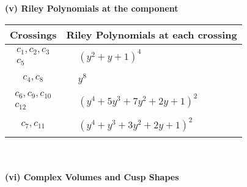 \documentclass[1p]{elsarticle_modified}
\theoremstyle{definition}
\begin{document}
\newpage\renewcommand{\arraystretch}{1}
\flushleft \textbf{(v) Riley Polynomials at the component}\newline \\
\begin{tabular}{m{50pt}|m{274pt}}
Crossings & \hspace{64pt}Riley Polynomials at each crossing \\
\hline $$\begin{aligned}c_{1},c_{2},c_{3}\\c_{5}\end{aligned}$$&$\begin{aligned}
&(y^2+y+1)^4
\end{aligned}$\\
\hline $$\begin{aligned}c_{4},c_{8}\end{aligned}$$&$\begin{aligned}
&y^8
\end{aligned}$\\
\hline $$\begin{aligned}c_{6},c_{9},c_{10}\\c_{12}\end{aligned}$$&$\begin{aligned}
&(y^4+5 y^3+7 y^2+2 y+1)^2
\end{aligned}$\\
\hline $$\begin{aligned}c_{7},c_{11}\end{aligned}$$&$\begin{aligned}
&(y^4+y^3+3 y^2+2 y+1)^2
\end{aligned}$\\
\hline
\end{tabular}\\~\\
\newpage\flushleft \textbf{(vi) Complex Volumes and Cusp Shapes}
\end{document}
